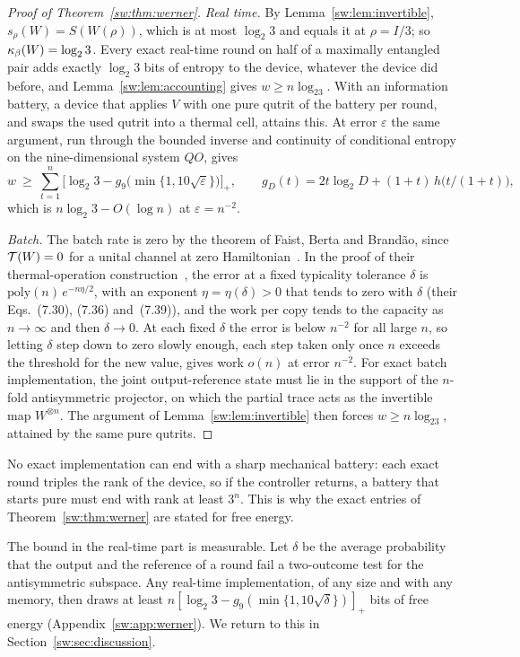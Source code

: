 \begin{proof}[Proof of Theorem~\ref{sw:thm:werner}]
\emph{Real time.} By Lemma~\ref{sw:lem:invertible}, $s_\rho(W)=S(W(\rho))$, which is at most $\log_2 3$ and equals it at $\rho=I/3$; so $\kappa_\beta(W)=\log_23$. Every exact real-time round on half of a maximally entangled pair adds exactly $\log_2 3$ bits of entropy to the device, whatever the device did before, and Lemma~\ref{sw:lem:accounting} gives $w\ge n\log_23$. With an information battery, a device that applies $V$ with one pure qutrit of the battery per round, and swaps the used qutrit into a thermal cell, attains this. At error $\varepsilon$ the same argument, run through the bounded inverse and continuity of conditional entropy on the nine-dimensional system $QO$, gives
\[
w\ \ge\ \sum_{t=1}^n\bigl[\log_2 3-g_9\bigl(\min\{1,10\sqrt{\varepsilon}\}\bigr)\bigr]_+,\qquad g_D(t)=2t\log_2 D+(1+t)\,h\bigl(t/(1+t)\bigr),
\]
which is $n\log_2 3-O(\log n)$ at $\varepsilon=n^{-2}$.

\emph{Batch.} The batch rate is zero by the theorem of Faist, Berta and Brand\~ao, since $\mathcal T(W)=0$ for a unital channel at zero Hamiltonian~\cite{FBB21}. In the proof of their thermal-operation construction~\cite[Thm.~7.1]{FBB21}, the error at a fixed typicality tolerance $\delta$ is $\mathrm{poly}(n)\,e^{-n\eta/2}$, with an exponent $\eta=\eta(\delta)>0$ that tends to zero with $\delta$ (their Eqs.~(7.30), (7.36) and~(7.39)), and the work per copy tends to the capacity as $n\to\infty$ and then $\delta\to0$. At each fixed $\delta$ the error is below $n^{-2}$ for all large $n$, so letting $\delta$ step down to zero slowly enough, each step taken only once $n$ exceeds the threshold for the new value, gives work $o(n)$ at error $n^{-2}$. For exact batch implementation, the joint output-reference state must lie in the support of the $n$-fold antisymmetric projector, on which the partial trace acts as the invertible map $W^{\otimes n}$. The argument of Lemma~\ref{sw:lem:invertible} then forces $w\ge n\log_23$, attained by the same pure qutrits.
\end{proof}

No exact implementation can end with a sharp mechanical battery: each exact round triples the rank of the device, so if the controller returns, a battery that starts pure must end with rank at least $3^n$. This is why the exact entries of Theorem~\ref{sw:thm:werner} are stated for free energy.

The bound in the real-time part is measurable. Let $\delta$ be the average probability that the output and the reference of a round fail a two-outcome test for the antisymmetric subspace. Any real-time implementation, of any size and with any memory, then draws at least $n[\log_2 3-g_9(\min\{1,10\sqrt{\delta}\})]_+$ bits of free energy (Appendix~\ref{sw:app:werner}). We return to this in Section~\ref{sw:sec:discussion}.

